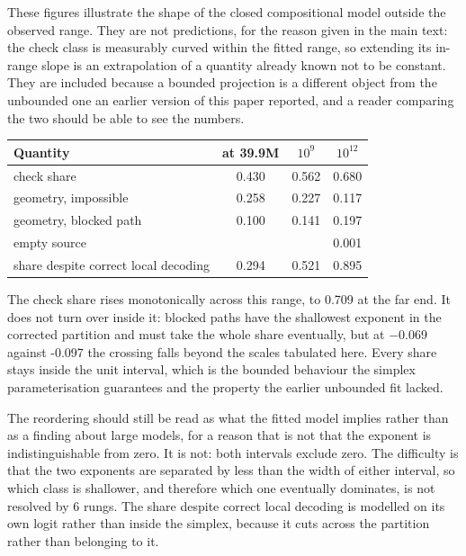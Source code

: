\documentclass[11pt]{article}
\begin{document}
These figures illustrate the shape of the closed compositional model outside the
observed range. They are not predictions, for the reason given in the main text: the
check class is measurably curved within the fitted range, so extending its in-range
slope is an extrapolation of a quantity already known not to be constant. They are
included because a bounded projection is a different object from the unbounded one an
earlier version of this paper reported, and a reader comparing the two should be able
to see the numbers.

\begin{center}
\small
\begin{tabular}{lccc}
\toprule
\textbf{Quantity} & \textbf{at 39.9M} & \textbf{$10^9$} & \textbf{$10^{12}$} \\
\midrule
check share & 0.430 & 0.562 & 0.680 \\
geometry, impossible & 0.258 & 0.227 & 0.117 \\
geometry, blocked path & 0.100 & 0.141 & 0.197 \\
empty source & & & 0.001 \\
share despite correct local decoding & 0.294 & 0.521 & 0.895 \\
\bottomrule
\end{tabular}
\end{center}

The check share rises monotonically across this range, to 0.709 at the far end.
It does not turn over inside it: blocked paths have the shallowest exponent in the
corrected partition and must take the whole share eventually, but at $-$0.069
against -0.097 the crossing falls beyond the scales tabulated here. Every share
stays inside the unit interval, which is the bounded behaviour the simplex
parameterisation guarantees and the property the earlier unbounded fit lacked.

The reordering should still be read as what the fitted model implies rather than as a
finding about large models, for a reason that is not that the exponent is
indistinguishable from zero. It is not: both intervals exclude zero. The difficulty is
that the two exponents are separated by less than the width of either interval, so
which class is shallower, and therefore which one eventually dominates, is not
resolved by 6 rungs. The share despite correct local decoding is modelled on
its own logit rather
than inside the simplex, because it cuts across the partition rather than belonging
to it.
\end{document}

